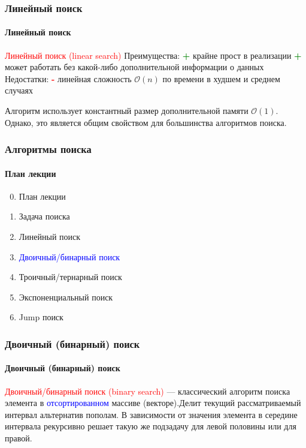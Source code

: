 \documentclass[aspectratio=169]{beamer}
\begin{document}
\begin{frame}
\frametitle{Линейный поиск}
\framesubtitle{Линейный поиск}
\justifying
\textcolor{red}{Линейный поиск (linear search)} \newline\newline
Преимущества:\newline
\textcolor{green} {\textbf{+}} крайне прост в реализации\newline
\textcolor{green} {\textbf{+}} может работать без какой-либо дополнительной информации о данных\newline\newline
Недостатки:\newline
\textcolor{red} {\textbf{-}} линейная сложность $\mathcal{O}(n)$ по времени в худшем и среднем случаях\newline

Алгоритм использует константный размер дополнительной памяти $\mathcal{O}(1)$. \newline Однако, это является общим свойством для большинства алгоритмов поиска.
\end{frame}

\begin{frame}
\frametitle{Алгоритмы поиска}
\framesubtitle{План лекции}

\begin{enumerate}
  \setcounter{enumi}{-1}
  \item{План лекции}
  \item{Задача поиска}
  \item{Линейный поиск}
  \item{\textcolor{blue}{Двоичный/бинарный поиск}}
  \item{Троичный/тернарный поиск}
  \item{Экспоненциальный поиск}
  \item{Jump поиск}
\end{enumerate}
\end{frame}

\begin{frame}
\frametitle{Двоичный (бинарный) поиск}
\framesubtitle{Двоичный (бинарный) поиск}
\justifying
\textcolor{red}{Двоичный/бинарный поиск (binary search)} — классический алгоритм поиска элемента в \textcolor{blue}{отсортированном} массиве (векторе).\newline\newline Делит текущий рассматриваемый интервал альтернатив пополам. В зависимости от значения элемента в середине интервала рекурсивно решает такую же подзадачу для левой половины или для правой.


\begin{figure}
    \captionsetup[subfigure]{labelformat=empty}
    \centering
\end{figure}
\end{frame}
\end{document}
